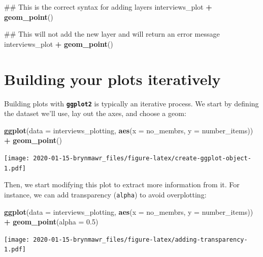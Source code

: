 \documentclass[]{book}
\newenvironment{Shaded}{\begin{snugshade}}{\end{snugshade}}
\newcommand{\KeywordTok}[1]{\textcolor[rgb]{0.13,0.29,0.53}{\textbf{#1}}}
\newcommand{\DataTypeTok}[1]{\textcolor[rgb]{0.13,0.29,0.53}{#1}}
\newcommand{\FloatTok}[1]{\textcolor[rgb]{0.00,0.00,0.81}{#1}}
\newcommand{\StringTok}[1]{\textcolor[rgb]{0.31,0.60,0.02}{#1}}
\newcommand{\OperatorTok}[1]{\textcolor[rgb]{0.81,0.36,0.00}{\textbf{#1}}}
\newcommand{\NormalTok}[1]{#1}
\begin{document}
\begin{Shaded}
\begin{Highlighting}[]
\NormalTok{## This is the correct syntax for adding layers}
\NormalTok{interviews_plot }\OperatorTok{+}
\StringTok{    }\KeywordTok{geom_point}\NormalTok{()}

\NormalTok{## This will not add the new layer and will return an error message}
\NormalTok{interviews_plot}
\OperatorTok{+}\StringTok{ }\KeywordTok{geom_point}\NormalTok{()}
\end{Highlighting}
\end{Shaded}

\section{Building your plots
iteratively}\label{building-your-plots-iteratively}

Building plots with \textbf{\texttt{ggplot2}} is typically an iterative
process. We start by defining the dataset we'll use, lay out the axes,
and choose a geom:

\begin{Shaded}
\begin{Highlighting}[]
\KeywordTok{ggplot}\NormalTok{(}\DataTypeTok{data =}\NormalTok{ interviews_plotting, }\KeywordTok{aes}\NormalTok{(}\DataTypeTok{x =}\NormalTok{ no_membrs, }\DataTypeTok{y =}\NormalTok{ number_items)) }\OperatorTok{+}
\StringTok{    }\KeywordTok{geom_point}\NormalTok{()}
\end{Highlighting}
\end{Shaded}

\texttt{[image: 2020-01-15-brynmawr\_files/figure-latex/create-ggplot-object-1.pdf]}

Then, we start modifying this plot to extract more information from it.
For instance, we can add transparency (\texttt{alpha}) to avoid
overplotting:

\begin{Shaded}
\begin{Highlighting}[]
\KeywordTok{ggplot}\NormalTok{(}\DataTypeTok{data =}\NormalTok{ interviews_plotting, }\KeywordTok{aes}\NormalTok{(}\DataTypeTok{x =}\NormalTok{ no_membrs, }\DataTypeTok{y =}\NormalTok{ number_items)) }\OperatorTok{+}
\StringTok{    }\KeywordTok{geom_point}\NormalTok{(}\DataTypeTok{alpha =} \FloatTok{0.5}\NormalTok{)}
\end{Highlighting}
\end{Shaded}

\texttt{[image: 2020-01-15-brynmawr\_files/figure-latex/adding-transparency-1.pdf]}
\end{document}
